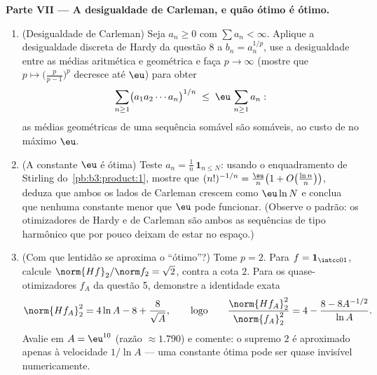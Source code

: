 \begin{problem}
\medskip
\noindent\textbf{Parte VII --- A desigualdade de Carleman, e quão
ótimo é ótimo.}
\begin{enumerate}[resume]
  \item (Desigualdade de Carleman) Seja $a_n \geq 0$ com $\sum
        a_n < \infty$. Aplique a
        desigualdade discreta de Hardy da questão 8 a $b_n = a_n^{1/p}$, use a
        desigualdade entre as médias aritmética e geométrica e faça
        $p \to
        \infty$ (mostre que $p \mapsto
        \bigl(\frac p{p-1}\bigr)^p$ decresce até $\eu$) para obter
        \[
        \sum_{n\geq1}\bigl(a_1a_2\cdots a_n\bigr)^{1/n}
        \;\leq\; \eu\,\sum_{n\geq1}a_n :
        \]
        as médias geométricas de uma sequência somável são somáveis, ao
        custo de no máximo $\eu$.
  \item (A constante $\eu$ é ótima) Teste $a_n =
        \frac1n\,\mathbf 1_{n\leq N}$: usando o
        enquadramento de Stirling do~\cref{pb:b3:product:1}, mostre que $(n!)^{-1/n} = \frac\eu n\bigl(1 +
        O\bigl(\frac{\ln n}n\bigr)\bigr)$,
        deduza que ambos os lados de Carleman crescem como $\eu\ln N$ e
        conclua que nenhuma constante menor que $\eu$ pode
        funcionar. (Observe o padrão: os otimizadores de Hardy e de
        Carleman são ambos as sequências de tipo harmônico que por
        pouco deixam de estar no espaço.)
  \item (Com que lentidão se aproxima o ``ótimo''?) Tome $p = 2$.
        Para $f = \mathbf 1_{\intcc01}$, calcule $\norm{Hf}_2/\norm f_2 = \sqrt2$, contra a cota $2$. Para os
        quase-otimizadores $f_A$ da questão 5, demonstre a
        identidade exata
        \[
        \norm{Hf_A}_2^2 = 4\ln A - 8 + \frac{8}{\sqrt A},
        \qquad\text{logo}\qquad
        \frac{\norm{Hf_A}_2^2}{\norm{f_A}_2^2}
        = 4 - \frac{8 - 8A^{-1/2}}{\ln A} .
        \]
        Avalie em $A = \eu^{10}$ (razão $\approx 1.790$) e comente: o supremo $2$ é
        aproximado apenas à velocidade $1/\ln A$ --- uma constante ótima
        pode ser quase invisível numericamente.
\end{enumerate}
\end{problem}
